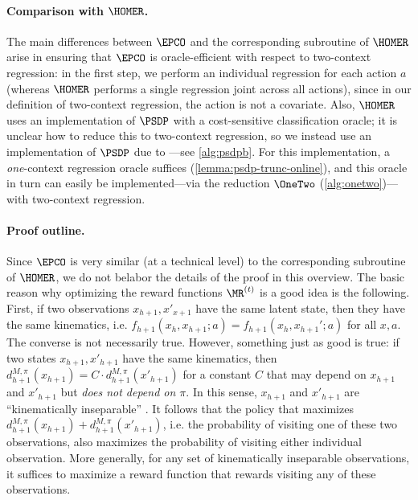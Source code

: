 \paragraph{Comparison with $\HOMER$.} The main differences between $\EPCO$ and the corresponding subroutine of $\HOMER$ arise in ensuring that $\EPCO$ is oracle-efficient with respect to two-context regression: in the first step, we perform an individual regression for each action $a$ (whereas $\HOMER$ performs a single regression joint across all actions), since in our definition of two-context regression, the action is not a covariate. Also, $\HOMER$ uses an implementation of $\PSDP$ with a cost-sensitive classification oracle; it is unclear how to reduce this to two-context regression, so we instead use an implementation of $\PSDP$ due to \cite{mhammedi2023representation}---see \cref{alg:psdpb}. For this implementation, a \emph{one}-context regression oracle suffices (\cref{lemma:psdp-trunc-online}), and this oracle in turn can easily be implemented---via the reduction $\OneTwo$ (\cref{alg:onetwo})---with two-context regression.

\paragraph{Proof outline.} Since $\EPCO$ is very similar (at a technical level) to the corresponding subroutine of $\HOMER$, we do not belabor the details of the proof in this overview. The basic reason why optimizing the reward functions $\MR^{(t)}$ is a good idea is the following. First, if two observations $x_{h+1},x'_{x+1}$ have the same latent state, then they have the same kinematics, i.e. $f_{h+1}(x_h,x_{h+1};a) = f_{h+1}(x_h,x_{h+1}';a)$ for all $x,a$. The converse is not necessarily true. However, something just as good is true: if two states $x_{h+1},x'_{h+1}$ have the same kinematics, then $d^{M,\pi}_{h+1}(x_{h+1}) = C \cdot d^{M,\pi}_{h+1}(x'_{h+1})$ for a constant $C$ that may depend on $x_{h+1}$ and $x'_{h+1}$ but \emph{does not depend on $\pi$}. In this sense, $x_{h+1}$ and $x'_{h+1}$ are ``kinematically inseparable'' \citep{misra2020kinematic}. It follows that the policy that maximizes $d^{M,\pi}_{h+1}(x_{h+1}) + d^{M,\pi}_{h+1}(x'_{h+1})$, i.e. the probability of visiting one of these two observations, also maximizes the probability of visiting either individual observation. More generally, for any set of kinematically inseparable observations, it suffices to maximize a reward function that rewards visiting any of these observations. 

